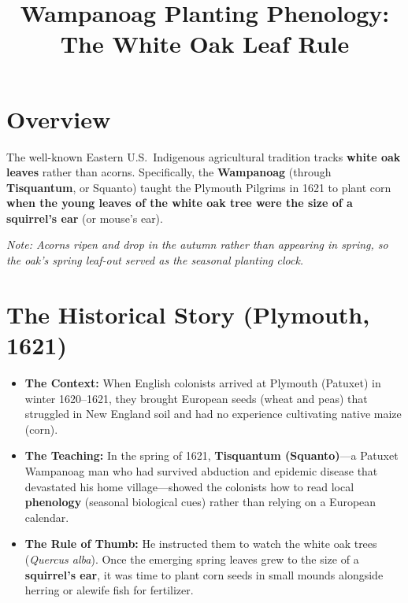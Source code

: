 \documentclass[11pt,a4paper]{article}
\title{\textbf{Wampanoag Planting Phenology: The White Oak Leaf Rule}}
\author{}
\date{}
\begin{document}
\maketitle

\section*{Overview}
The well-known Eastern U.S.\ Indigenous agricultural tradition tracks \textbf{white oak leaves} rather than acorns. Specifically, the \textbf{Wampanoag} (through \textbf{Tisquantum}, or Squanto) taught the Plymouth Pilgrims in 1621 to plant corn \textbf{when the young leaves of the white oak tree were the size of a squirrel's ear} (or mouse's ear).

\textit{Note: Acorns ripen and drop in the autumn rather than appearing in spring, so the oak's spring leaf-out served as the seasonal planting clock.}

\section{The Historical Story (Plymouth, 1621)}
\begin{itemize}[leftmargin=1.5em]
    \item \textbf{The Context:} When English colonists arrived at Plymouth (Patuxet) in winter 1620--1621, they brought European seeds (wheat and peas) that struggled in New England soil and had no experience cultivating native maize (corn).
    \item \textbf{The Teaching:} In the spring of 1621, \textbf{Tisquantum (Squanto)}---a Patuxet Wampanoag man who had survived abduction and epidemic disease that devastated his home village---showed the colonists how to read local \textbf{phenology} (seasonal biological cues) rather than relying on a European calendar.
    \item \textbf{The Rule of Thumb:} He instructed them to watch the white oak trees (\textit{Quercus alba}). Once the emerging spring leaves grew to the size of a \textbf{squirrel's ear}, it was time to plant corn seeds in small mounds alongside herring or alewife fish for fertilizer.
\end{itemize}
\end{document}
